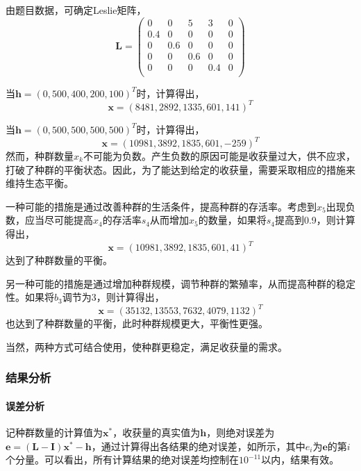 \documentclass[12pt,a4paper]{article}
\begin{document}
由题目数据，可确定Leslie矩阵，
\begin{equation}\label{eq:ex9_matrix_a}
    \boldsymbol{L} = \left(\begin{matrix}
        0   & 0   & 5   & 3   & 0\\
        0.4 & 0   & 0   & 0   & 0\\
        0   & 0.6 & 0   & 0   & 0\\
        0   & 0   & 0.6 & 0   & 0\\
        0   & 0   & 0   & 0.4 & 0\\
    \end{matrix}\right)
\end{equation}

当$\boldsymbol{h} = (0,500,400,200,100)^T$时，计算得出，
\begin{equation}\label{eq:ex9_normal}
    \boldsymbol{x} = (8481,2892,1335,601,141)^T
\end{equation}

当$\boldsymbol{h}=(0,500,500,500,500)^T$时，计算得出，
\begin{equation}\label{eq:ex9_negative}
    \boldsymbol{x} = (10981,3892,1835,601,-259)^T
\end{equation}
然而，种群数量$x_k$不可能为负数。产生负数的原因可能是收获量过大，供不应求，打破了种群的平衡状态。因此，为了能达到给定的收获量，需要采取相应的措施来维持生态平衡。

一种可能的措施是通过改善种群的生活条件，提高种群的存活率。考虑到$x_5$出现负数，应当尽可能提高$x_4$的存活率$s_4$从而增加$x_5$的数量，如果将$s_4$提高到0.9，则计算得出，
\begin{equation}\label{eq:ex9_survival}
    \boldsymbol{x} = (10981,3892,1835,601,41)^T
\end{equation}
达到了种群数量的平衡。

另一种可能的措施是通过增加种群规模，调节种群的繁殖率，从而提高种群的稳定性。如果将$b_3$调节为3，则计算得出，
\begin{equation}\label{eq:ex9_reproduction}
    \boldsymbol{x} = (35132,13553,7632,4079,1132)^T
\end{equation}
也达到了种群数量的平衡，此时种群规模更大，平衡性更强。

当然，两种方式可结合使用，使种群更稳定，满足收获量的需求。

\subsubsection{结果分析}

\paragraph{误差分析} 记种群数量的计算值为$\boldsymbol{x}^*$，收获量的真实值为$\boldsymbol{h}$，则绝对误差为$\boldsymbol{e} = (\boldsymbol{L} - \boldsymbol{I})\boldsymbol{x}^* - \boldsymbol{h}$，通过计算得出各结果的绝对误差，如所示，其中$e_i$为$\boldsymbol{e}$的第$i$个分量。可以看出，所有计算结果的绝对误差均控制在$10^{-11}$以内，结果有效。
\end{document}
